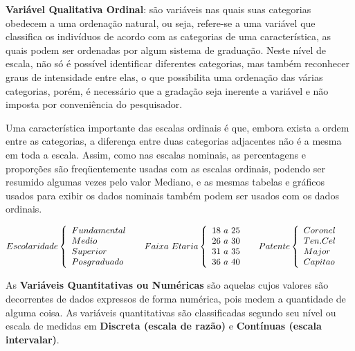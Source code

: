 \begin{enumerate}
\textbf{Variável Qualitativa Ordinal}: são variáveis nas quais suas categorias obedecem a uma ordenação natural, ou seja, refere-se a uma variável que classifica os indivíduos de acordo com as categorias de uma característica, as quais podem ser ordenadas por algum sistema de graduação. Neste nível de escala, não só é possível identificar diferentes categorias, mas também reconhecer graus de intensidade entre elas, o que possibilita uma ordenação das várias categorias, porém, é necessário que a gradação seja inerente a variável e não imposta por conveniência do pesquisador. 

\newpage
Uma característica importante das escalas ordinais é que, embora exista a ordem entre as categorias, a diferença entre duas categorias adjacentes não é a mesma em toda a escala. Assim, como nas escalas nominais, as percentagens e proporções são freqüentemente usadas com as escalas ordinais, podendo ser resumido algumas vezes pelo valor Mediano, e as mesmas tabelas e gráficos usados para exibir os dados nominais também podem ser usados com os dados ordinais.
\end{enumerate}

$$
    Escolaridade
    \left\{
    \begin{array}{ll}
    Fundamental  & \hbox{ } \\
    Medio        & \hbox{ } \\
    Superior     & \hbox{ } \\
    Posgraduado  & \hbox{ }
    \end{array}
    \right.
    Faixa \ Etaria
    \left\{
    \begin{array}{ll}
    18 \ a \ 25   & \hbox{ } \\
    26 \ a \ 30   & \hbox{ } \\
    31 \ a \ 35   & \hbox{ } \\
    36 \ a \ 40   & \hbox{ }
    \end{array}
    \right.
    Patente
 \left\{
    \begin{array}{ll}
    Coronel        & \hbox{ } \\
    Ten. Cel       & \hbox{ } \\
    Major          & \hbox{ } \\
    Capitao        & \hbox{ }
    \end{array}
    \right.
$$

As \textbf{Variáveis Quantitativas ou Numéricas} são aquelas cujos valores são de\-cor\-ren\-tes de dados expressos de forma numérica, pois medem a quantidade de alguma coisa. As variáveis quantitativas são classificadas segundo seu nível ou escala de medidas em \textbf{Discreta (escala de razão)} e \textbf{Contínuas (escala intervalar)}.

